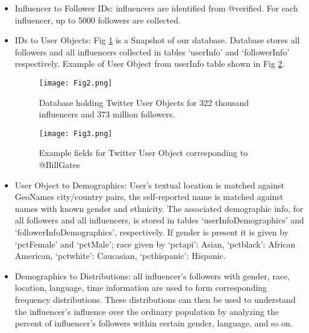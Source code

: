 \begin{itemize}
\item Influencer to Follower IDs: influencers are identified from @verified. For each influencer, up to 5000 followers are collected. %

\item IDs to User Objects: Fig \ref{fig_ch7_2} is a Snapshot of our database. Database stores all followers and all influencers collected in tables `userInfo' and `followerInfo' respectively. Example of User Object from userInfo table shown in Fig \ref{fig_ch7_3}.

\begin{figure}[htbp]
\centerline{\texttt{[image: Fig2.png]}}
\caption[Database holding Twitter User Objects]{Database holding Twitter User Objects for 322 thousand influencers and 373 million followers.}
\label{fig_ch7_2}
\end{figure}

\begin{figure}[htbp]
\centerline{\texttt{[image: Fig3.png]}}
\caption{Example fields for Twitter User Object corresponding to @BillGates}
\label{fig_ch7_3}
\end{figure}

\item User Object to Demographics: User's textual location is matched against GeoNames city/country pairs, the self-reported name is matched against names with known gender and ethnicity. The associated demographic info, for all followers and all influencers, is stored in tables `userInfoDemographics' and `followerInfoDemographics', respectively. If gender is present it is given by `pctFemale' and `pctMale'; race given by `pctapi': Asian, `pctblack': African American, `pctwhite': Caucasian, `pcthispanic': Hispanic. %

\item Demographics to Distributions: all influencer's followers with gender, race, location, language, time information are used to form corresponding frequency distributions. These distributions can then be used to understand the influencer's influence over the ordinary population by analyzing the percent of influencer's followers within certain gender, language, and so on. %
\end{itemize}

